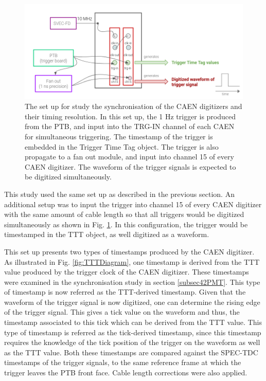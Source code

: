 \begin{figure}[htbp!] 
\centering    
\includegraphics[width=1.0\textwidth]{digitize_ftrig}
\caption[digitizeFTRIG]{
The set up for study the synchronisation of the CAEN digitizers and their timing resolution.
In this set up, the 1 Hz trigger is produced from the PTB, and input into the TRG-IN channel of each CAEN for simultaneous triggering.
The timestamp of the trigger is embedded in the Trigger Time Tag object.
The trigger is also propagate to a fan out module, and input into channel 15 of every CAEN digitizer.
The waveform of the trigger signals is expected to be digitized simultaneously. 
}
\label{fig:digitizeFTRIG}
\end{figure}

This study used the same set up as described in the previous section.
An additional setup was to input the trigger into channel 15 of every CAEN digitizer with the same amount of cable length so that all triggers would be digitized simultaneously as shown in Fig. \ref{fig:digitizeFTRIG}.
In this configuration, the trigger would be timestamped in the TTT object, as well digitized as a waveform. 

This set up presents two types of timestamps produced by the CAEN digitizer.
As illustrated in Fig. \ref {fig:TTTDiagram}, one timestamp is derived from the TTT value produced by the trigger clock of the CAEN digitizer.
These timestamps were examined in the synchronisation study in section \ref{subsec42PMT}.
This type of timestamp is now referred as the TTT-derived timestamp.
Given that the waveform of the trigger signal is now digitized, one can determine the rising edge of the trigger signal.
This gives a tick value on the waveform and thus, the timestamp associated to this tick which can be derived from the TTT value.
This type of timestamp is referred as the tick-derived timestamp, since this timestamp requires the knowledge of the tick position of the trigger on the waveform as well as the TTT value.
Both these timestamps are compared against the SPEC-TDC timestamps of the trigger signals, to the same reference frame at which the trigger leaves the PTB front face.
Cable length corrections were also applied.

